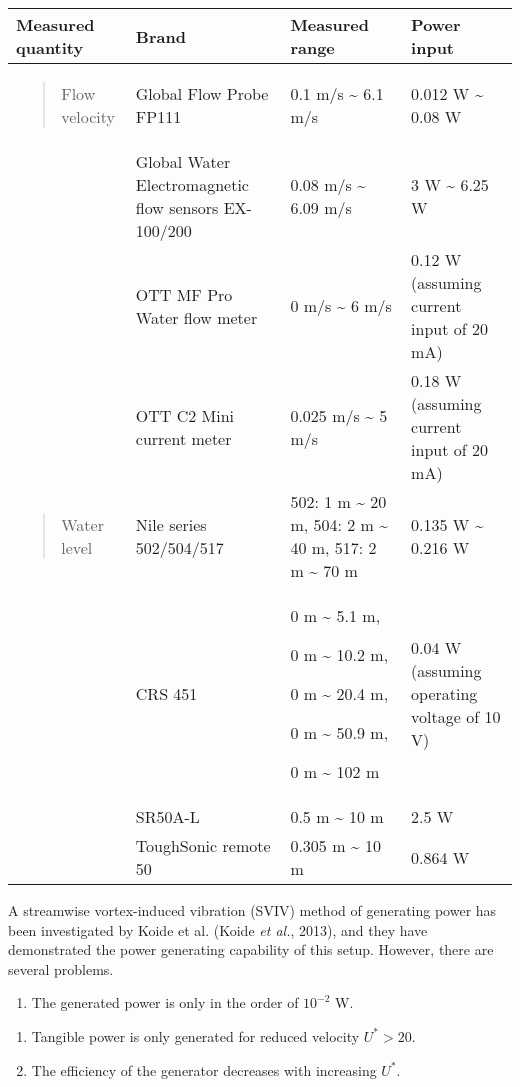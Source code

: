 \documentclass[]{article}
\begin{document}
\begin{longtable}[]{@{}llll@{}}
\toprule
Measured quantity & Brand & Measured range & Power input\tabularnewline
\midrule
\endhead
\begin{quote}
Flow velocity
\end{quote} & Global Flow Probe FP111 & 0.1 m/s \textasciitilde{} 6.1
m/s & 0.012 W \textasciitilde{} 0.08 W\tabularnewline
& Global Water Electromagnetic flow sensors EX-100/200 & 0.08 m/s
\textasciitilde{} 6.09 m/s & 3 W \textasciitilde{} 6.25 W\tabularnewline
& OTT MF Pro Water flow meter & 0 m/s \textasciitilde{} 6 m/s & 0.12 W
(assuming current input of 20 mA)\tabularnewline
& OTT C2 Mini current meter & 0.025 m/s \textasciitilde{} 5 m/s & 0.18 W
(assuming current input of 20 mA)\tabularnewline
\begin{quote}
Water level
\end{quote} & Nile series 502/504/517 & 502: 1 m \textasciitilde{} 20 m,
504: 2 m \textasciitilde{} 40 m, 517: 2 m \textasciitilde{} 70 m & 0.135
W \textasciitilde{} 0.216 W\tabularnewline
& CRS 451 & 0 m \textasciitilde{} 5.1 m,

0 m \textasciitilde{} 10.2 m,

0 m \textasciitilde{} 20.4 m,

0 m \textasciitilde{} 50.9 m,

0 m \textasciitilde{} 102 m & 0.04 W (assuming operating voltage of 10
V)\tabularnewline
& SR50A-L & 0.5 m \textasciitilde{} 10 m & 2.5 W\tabularnewline
& ToughSonic remote 50 & 0.305 m \textasciitilde{} 10 m & 0.864
W\tabularnewline
\bottomrule
\end{longtable}

A streamwise vortex-induced vibration (SVIV) method of generating power
has been investigated by Koide et al. (Koide \emph{et al.}, 2013), and
they have demonstrated the power generating capability of this setup.
However, there are several problems.

\begin{enumerate}
\def\labelenumi{\roman{enumi})}
\item
  The generated power is only in the order of \(10^{- 2}\) W.
\end{enumerate}

\begin{enumerate}
\def\labelenumi{\roman{enumi})}
\item
  Tangible power is only generated for reduced velocity \(U^{*} > 20\).
\item
  The efficiency of the generator decreases with increasing \(U^{*}\).
\end{enumerate}
\end{document}
